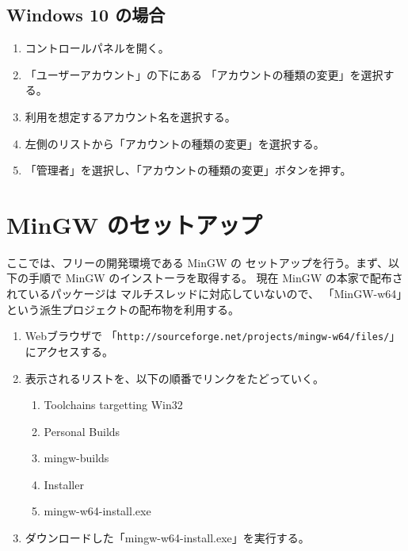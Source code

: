 \documentclass[a4paper]{jsarticle}
\begin{document}
\subsection{Windows 10 の場合}
\begin{enumerate}
 \item コントロールパネルを開く。
 \item 「ユーザーアカウント」の下にある
	「アカウントの種類の変更」を選択する。
 \item 利用を想定するアカウント名を選択する。
 \item 左側のリストから「アカウントの種類の変更」を選択する。
 \item 「管理者」を選択し、「アカウントの種類の変更」ボタンを押す。
\end{enumerate}

\section{MinGW のセットアップ}
ここでは、フリーの開発環境である MinGW の
セットアップを行う。まず、以下の手順で MinGW のインストーラを取得する。
現在 MinGW の本家で配布されているパッケージは
マルチスレッドに対応していないので、
「MinGW-w64」という派生プロジェクトの配布物を利用する。

\begin{enumerate}
 \item Webブラウザで
	「\verb+http://sourceforge.net/projects/mingw-w64/files/+」にアクセスする。

 \item 表示されるリストを、以下の順番でリンクをたどっていく。
 \begin{enumerate}
	\item Toolchains targetting Win32
	\item Personal Builds
	\item mingw-builds
	\item Installer
	\item mingw-w64-install.exe
 \end{enumerate}

 \item ダウンロードした「mingw-w64-install.exe」を実行する。
\end{enumerate}
\end{document}
